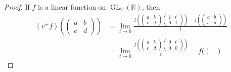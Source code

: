 \documentclass[11pt, a4paper]{amsart}
\theoremstyle{plain}
\theoremstyle{definition}
\numberwithin{equation}{section}
\def\RR{\mathbb{R}}
\DeclareMathOperator{\GL}{\mathrm{GL}}
\begin{document}
\begin{proof}
    If $f$ is a linear function on $\GL_{2}(\RR)$, then
        \begin{align*}
            (v^{+}f)(\begin{pmatrix}
                        a & b \\
                        c & d
                     \end{pmatrix}) &= \lim_{t \rightarrow 0} \frac{f(\begin{pmatrix}
                                                                        a & b \\
                                                                        c & d
                                                                     \end{pmatrix} \begin{pmatrix}
                                                                                        1 & t \\
                                                                                        0 & 1
                                                                                    \end{pmatrix}) - f(\begin{pmatrix}
                                                                                                            a & b \\
                                                                                                            c & d
                                                                                                         \end{pmatrix}) }{t} \\
                                   &= \lim_{t \rightarrow 0} \frac{f(\begin{pmatrix}
                                                                        a & b \\
                                                                        c & d
                                                                     \end{pmatrix} \begin{pmatrix}
                                                                                        0 & t \\
                                                                                        0 & 0
                                                                                    \end{pmatrix})}{t} = f(\begin{pmatrix}

\end{pmatrix}
\end{align*}
\end{proof}
\end{document}
